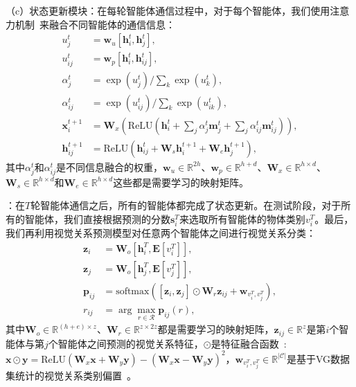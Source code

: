 （c）状态更新模块：在每轮智能体通信过程中，对于每个智能体，我们使用注意力机制~\cite{chen2017sca}来融合不同智能体的通信信息：
\begin{equation}
\begin{aligned}
    u^t_j &= \bm{w}_u [\bm{h}^t_i, \bm{h}^t_j], \\ 
    u^t_{ij} &= \bm{w}_p [\bm{h}^t_i, \bm{h}^t_{ij}], \\
    \alpha^t_j & = \exp(u^t_j) / \textstyle{\sum_k} \exp(u^t_k), \\
    \alpha^t_{ij} & = \exp(u^t_{ij}) / \textstyle{\sum_k} \exp(u^t_{ik}), \\
    \bm{x}^{t+1}_i &= \bm{W}_x (\text{ReLU} (\bm{h}^t_i + \textstyle{\sum_j} \alpha^t_j \bm{m}^t_j +  \textstyle{\sum_j} \alpha^t_{ij} \bm{m}^t_{ij})), \\
    \bm{h}^{t+1}_{ij} &= \text{ReLU} (\bm{h}^t_{ij} + \bm{W}_s \bm{h}^{t+1}_i + \bm{W}_e \bm{h}^{t+1}_j),
\end{aligned}
\end{equation}
其中$\alpha^t_j$和$\alpha^t_{ij}$是不同信息融合的权重，$\bm{w}_u \in \mathbb{R}^{2h}$、$\bm{w}_p \in \mathbb{R}^{h+d}$、$\bm{W}_x \in \mathbb{R}^{h\times d}$、$\bm{W}_s \in \mathbb{R}^{h\times d}$和$\bm{W}_e \in \mathbb{R}^{h\times d}$这些都是需要学习的映射矩阵。


\textbf{}：在$T$轮智能体通信之后，所有的智能体都完成了状态更新。在测试阶段，对于所有的智能体，我们直接根据预测的分数$\bm{s}^T_i$来选取所有智能体的物体类别$v^T_i$。最后，我们再利用视觉关系预测模型对任意两个智能体之间进行视觉关系分类：
\begin{equation}
\begin{aligned}
    \bm{z}_i & = \bm{W}_o [\bm{h}^T_i, \mathbf{E}[v^T_i]], \\
    \bm{z}_j & = \bm{W}_o [\bm{h}^T_j, \mathbf{E}[v^T_j]], \\
    \bm{p}_{ij} & = \text{softmax} ([\bm{z}_i,  \bm{z}_j] \odot \bm{W}_r \bm{z}_{ij} + \bm{w}_{v^T_i, v^T_j}), \\
    r_{ij} & = \arg \textstyle{\max_{r \in \mathcal{R}}} \bm{p}_{ij}(r),
\end{aligned}
\end{equation}
其中$\bm{W}_o \in \mathbb{R}^{(h+e) \times z}$、$\bm{W}_r \in \mathbb{R}^{z\times 2z}$都是需要学习的映射矩阵，$\bm{z}_{ij} \in \mathbb{R}^z$是第$i$个智能体与第$j$个智能体之间预测的视觉关系特征，$\odot$是特征融合函数~\cite{zhang2018learning}: $\bm{x} \odot \bm{y} = \text{ReLU}(\bm{W}_x \bm{x} + \bm{W}_y \bm{y}) - (\bm{W}_x \bm{x} - \bm{W}_y \bm{y})^2$，$\bm{w}_{v^T_i, v^T_j} \in \mathbb{R}^{|\mathcal{C}|}$是基于VG数据集统计的视觉关系类别偏置~\cite{zellers2018neural}。 


